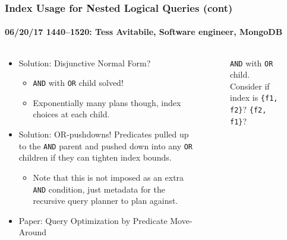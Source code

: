 \documentclass[xcolor=dvipsnames, 9pt]{beamer}
\begin{document}
\begin{frame}
    \frametitle{Index Usage for Nested Logical Queries (cont)}
    \framesubtitle{%
        06/20/17 1440--1520:
        Tess Avitabile, Software engineer, MongoDB
    }
    \begin{columns}
        \begin{column}{0.5\textwidth}
            \begin{itemize}
                \item Solution: Disjunctive Normal Form?
                    \begin{itemize}
                        \item \texttt{AND} with \texttt{OR} child solved!
                        \item Exponentially many plans though, index choices at
                            each child.
                    \end{itemize}
                \item Solution: OR-pushdowns! Predicates pulled up to the
                    \texttt{AND} parent and pushed down into any \texttt{OR}
                    children if they can tighten index bounds.
                    \begin{itemize}
                        \item Note that this is not imposed as an extra
                            \texttt{AND} condition, just metadata for the
                            recursive query planner to plan against.
                    \end{itemize}
                \item Paper: Query Optimization by Predicate Move-Around
            \end{itemize}
        \end{column}
        \begin{column}{0.5\textwidth}
            \begin{figure}[!h]
                \centering
                \caption{\texttt{AND} with \texttt{OR} child. Consider if index
                is \texttt{\{f1, f2\}}? \texttt{\{f2, f1\}}?\label{fig:and_or}}
            \end{figure}
        \end{column}
    \end{columns}
\end{frame}
\end{document}
